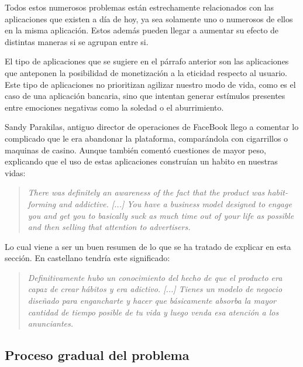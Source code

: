 Todos estos numerosos problemas están estrechamente relacionados con las aplicaciones que existen a día de hoy, ya sea solamente uno o numerosos de ellos en la misma aplicación. Estos además pueden llegar a aumentar su efecto de distintas maneras si se agrupan entre si.

\vspace{0.3cm}

El tipo de aplicaciones que se sugiere en el párrafo anterior son las aplicaciones que anteponen la posibilidad de monetización a la eticidad respecto al usuario. Este tipo de aplicaciones no prioritizan agilizar nuestro modo de vida, como es el caso de una aplicación bancaria, sino que intentan generar estímulos presentes entre emociones negativas como la soledad o el aburrimiento.

\vspace{0.3cm}

Sandy Parakilas, antiguo director de operaciones de FaceBook llego a comentar lo complicado que le era abandonar la plataforma, comparándola con cigarrillos o maquinas de casino. Aunque también comentó cuestiones de mayor peso, explicando que el uso de estas aplicaciones construían un habito en nuestras vidas: \cite{Social-Deliberately}

\begin{quotation}
		\textit{There was definitely an awareness of the fact that the product was habit-forming and addictive. [...] You have a business model designed to engage you and get you to basically suck as much time out of your life as possible and then selling that attention to advertisers.}
\end{quotation}

Lo cual viene a ser un buen resumen de lo que se ha tratado de explicar en esta sección. En castellano tendría este significado:

\begin{quotation}
		\textit{Definitivamente hubo un conocimiento del hecho de que el producto era capaz de crear hábitos y era adictivo. [...] Tienes un modelo de negocio diseñado para engancharte y hacer que básicamente absorba la mayor cantidad de tiempo posible de tu vida y luego venda esa atención a los anunciantes.}
\end{quotation}

\subsection{Proceso gradual del problema}\label{sec:prosc_problm}

